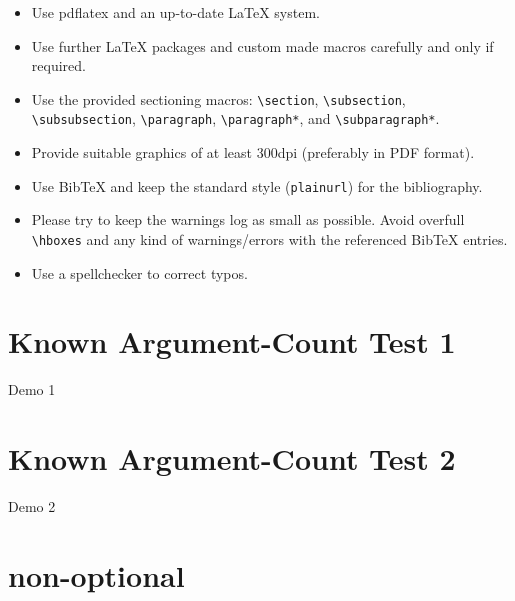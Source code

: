 \documentclass[a4paper,UKenglish,cleveref, autoref, thm-restate]{lipics-v2021}
\begin{document}
\begin{itemize}
\item Use pdflatex and an up-to-date \LaTeX{} system.
\item Use further \LaTeX{} packages and custom made macros carefully and only if required.
\item Use the provided sectioning macros: \verb+\section+, \verb+\subsection+, \verb+\subsubsection+, \linebreak \verb+\paragraph+, \verb+\paragraph*+, and \verb+\subparagraph*+.
\item Provide suitable graphics of at least 300dpi (preferably in PDF format).
\item Use BibTeX and keep the standard style (\verb+plainurl+) for the bibliography.
\item Please try to keep the warnings log as small as possible. Avoid overfull \verb+\hboxes+ and any kind of warnings/errors with the referenced BibTeX entries.
\item Use a spellchecker to correct typos.
\end{itemize}

\section{Known Argument-Count Test 1} {Demo 1}

\section[Optional]{Known Argument-Count Test 2} {Demo 2}


\section*[optional]{non-optional}
\end{document}

